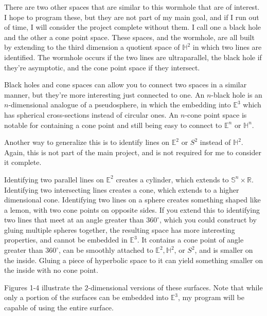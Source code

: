 \documentclass[12pt]{amsart}
\begin{document}
There are two other spaces that are similar to this wormhole that are of interest. I hope to program these, but they are not part of my main goal, and if I run out of time, I will consider the project complete without them. I call one a black hole and the other a cone point space. These spaces, and the wormhole, are all built by extending to the third dimension a quotient space of $\mathbb{H}^2$ in which two lines are identified. The wormhole occurs if the two lines are ultraparallel, the black hole if they're asymptotic, and the cone point space if they intersect.

Black holes and cone spaces can allow you to connect two spaces in a similar manner, but they're more interesting just connected to one. An $n$-black hole is an $n$-dimensional analogue of a pseudosphere, in which the embedding into $\mathbb{E}^3$ which has spherical cross-sections instead of circular ones. An $n$-cone point space is notable for containing a cone point and still being easy to connect to $\mathbb{E}^n$ or $\mathbb{H}^n$.

Another way to generalize this is to identify lines on $\mathbb{E}^2$ or $S^2$ instead of $\mathbb{H}^2$. Again, this is not part of the main project, and is not required for me to consider it complete.

Identifying two parallel lines on $\mathbb{E}^2$ creates a cylinder, which extends to $\mathbb{S}^n \times \mathbb{R}$. Identifying two intersecting lines creates a cone, which extends to a higher dimensional cone. Identifying two lines on a sphere creates something shaped like a lemon, with two cone points on opposite sides. If you extend this to identifying two lines that meet at an angle greater than $360^\circ$, which you could construct by gluing multiple spheres together, the resulting space has more interesting properties, and cannot be embedded in $\mathbb{E}^3$.  It contains a cone point of angle greater than $360^\circ$, can be smoothly attached to $\mathbb{E}^2, \mathbb{H}^2$, or $S^2$, and is smaller on the inside. Gluing a piece of hyperbolic space to it can yield something smaller on the inside with no cone point.

Figures 1-4 illustrate the $2$-dimensional versions of these surfaces. Note that while only a portion of the surfaces can be embedded into $\mathbb{E}^3$, my program will be capable of using the entire surface.
\end{document}

